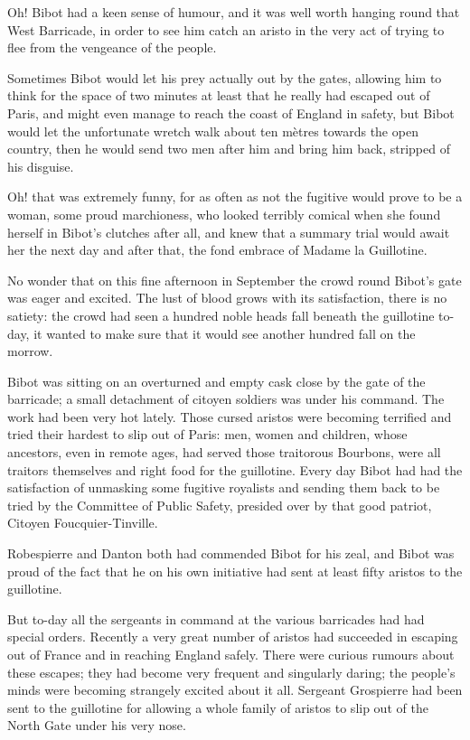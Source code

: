 \documentclass[paper=5.5in:8.5in,BCOR=7mm,twoside,DIV=calc,12pt,usegeometry,chapterprefix,endperiod,headings=big]{scrbook}
\begin{document}
Oh! Bibot had a keen sense of humour, and it was well worth hanging round that West Barricade, in order to see him catch an aristo in the very act of trying to flee from the vengeance of the people.

Sometimes Bibot would let his prey actually out by the gates, allowing him to think for the space of two minutes at least that he really had escaped out of Paris, and might even manage to reach the coast of England in safety, but Bibot would let the unfortunate wretch walk about ten mètres towards the open country, then he would send two men after him and bring him back, stripped of his disguise.

Oh! that was extremely funny, for as often as not the fugitive would prove to be a woman, some proud marchioness, who looked terribly comical when she found herself in Bibot's clutches after all, and knew that a summary trial would await her the next day and after that, the fond embrace of Ma\-dame la Guillotine.

No wonder that on this fine afternoon in September the crowd round Bibot's gate was eager and excited. The lust of blood grows with its satisfaction, there is no satiety: the crowd had seen a hundred noble heads fall beneath the guillotine to-day, it wanted to make sure that it would see another hundred fall on the morrow.

Bibot was sitting on an overturned and empty cask close by the gate of the barricade; a small detachment of citoyen soldiers was under his command. The work had been very hot lately. Those cursed aristos were becoming terrified and tried their hardest to slip out of Paris: men, women and children, whose ancestors, even in remote ages, had served those traitorous Bourbons, were all traitors themselves and right food for the guillotine. Every day Bibot had had the satisfaction of unmasking some fugitive royalists and sending them back to be tried by the Committee of Public Safety, presided over by that good patriot, Citoyen Foucquier-Tinville.

Robespierre and Danton both had commended Bibot for his zeal, and Bibot was proud of the fact that he on his own initiative had sent at least fifty aristos to the guillotine.

But to-day all the sergeants in command at the various barricades had had special orders. Recently a very great number of aristos had succeeded in escaping out of France and in reaching England safely. There were curious rumours about these escapes; they had become very frequent and singularly daring; the people's minds were becoming strangely excited about it all. Sergeant Grospierre had been sent to the guillotine for allowing a whole family of aristos to slip out of the North Gate under his very nose.
\end{document}
